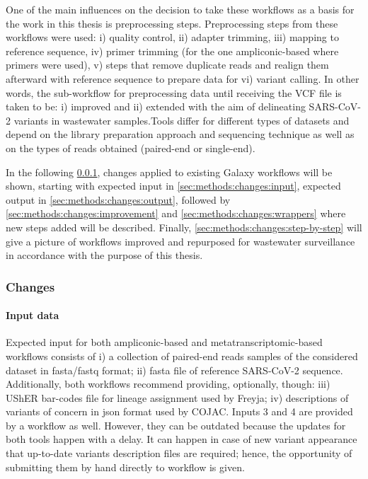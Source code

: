         One of the main influences on the decision to take these workflows as a basis for the work in this thesis is preprocessing steps. Preprocessing steps from these workflows were used: i) quality control, ii) adapter trimming, iii) mapping to reference sequence, iv) primer trimming (for the one ampliconic-based where primers were used), v) steps that remove duplicate reads and realign them afterward with reference sequence to prepare data for vi) variant calling. In other words, the sub-workflow for preprocessing data until receiving the VCF file is taken to be: i) improved and ii) extended with the aim of delineating SARS-CoV-2 variants in wastewater samples.Tools differ for different types of datasets and depend on the library preparation approach and sequencing technique as well as on the types of reads obtained (paired-end or single-end). 
        
        In the following \cref{sec:methods:changes}, changes applied to existing Galaxy workflows will be shown, starting with expected input in \autoref{sec:methods:changes:input}, expected output in \autoref{sec:methods:changes:output}, followed by \autoref{sec:methods:changes:improvement} and \autoref{sec:methods:changes:wrappers} where new steps added will be described. Finally, \autoref{sec:methods:changes:step-by-step} will give a picture of workflows improved and repurposed for wastewater surveillance in accordance with the purpose of this thesis. 

        \subsubsection{Changes} \label{sec:methods:changes}
            \paragraph{Input data} \label{sec:methods:changes:input}
            Expected input for both ampliconic-based and metatranscriptomic-based workflows consists of i) a collection of paired-end reads samples of the considered dataset in \acrshort{fasta}/\acrshort{fastq} format; ii) \acrshort{fasta} file of reference SARS-CoV-2 sequence. Additionally, both workflows recommend providing, optionally, though: iii) UShER bar-codes file for lineage assignment used by Freyja; iv) descriptions of variants of concern in \acrshort{json} format used by COJAC. Inputs 3 and 4 are provided by a workflow as well. However, they can be outdated because the updates for both tools happen with a delay. It can happen in case of new variant appearance that up-to-date variants description files are required; hence, the opportunity of submitting them by hand directly to workflow is given.
    
